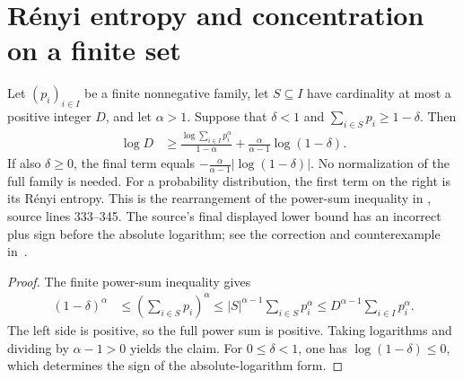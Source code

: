 \section{Rényi entropy and concentration on a finite set}

\begin{theorem}
    \label{thm:renyi_mass_cardinality}
    \leanok
    Let $(p_i)_{i\in I}$ be a finite nonnegative family, let $S\subseteq I$
    have cardinality at most a positive integer $D$, and let $\alpha>1$.
    Suppose that $\delta<1$ and $\sum_{i\in S}p_i\ge1-\delta$. Then
    \begin{align}
        \log D & \ge \frac{\log\sum_{i\in I}p_i^\alpha}{1-\alpha}
        +\frac{\alpha}{\alpha-1}\log(1-\delta).
    \end{align}
    If also $\delta\ge0$, the final term equals
    $-\frac{\alpha}{\alpha-1}|\log(1-\delta)|$.
    No normalization of the full family is needed. For a probability
    distribution, the first term on the right is its Rényi entropy.
    This is the rearrangement of the power-sum inequality in
    \cite{Schuch2008EntropyScaling}, source lines 333--345. The source's
    final displayed lower bound has an incorrect plus sign before the
    absolute logarithm; see the correction and counterexample
    in~\cite{gap:swvc08_renyi_bond_dimension_sign}.
\end{theorem}
\begin{proof}\leanok
    The finite power-sum inequality gives
    \begin{align}
        (1-\delta)^\alpha
         & \le \left(\sum_{i\in S}p_i\right)^\alpha
        \le |S|^{\alpha-1}\sum_{i\in S}p_i^\alpha
        \le D^{\alpha-1}\sum_{i\in I}p_i^\alpha.
    \end{align}
    The left side is positive, so the full power sum is positive.
    Taking logarithms and dividing by $\alpha-1>0$ yields the claim.
    For $0\le\delta<1$, one has $\log(1-\delta)\le0$, which determines
    the sign of the absolute-logarithm form.
\end{proof}
